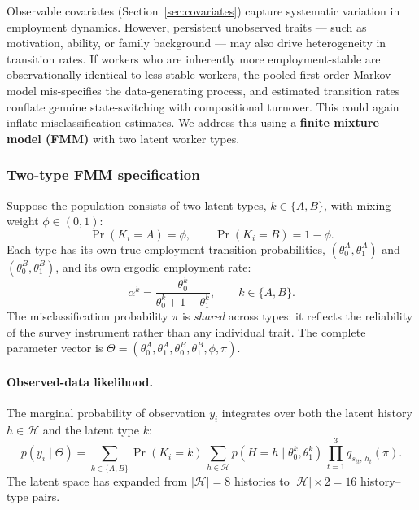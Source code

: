 Observable covariates (Section~\ref{sec:covariates}) capture systematic
variation in employment dynamics. However, persistent unobserved traits
--- such as motivation, ability, or family background --- may also drive
heterogeneity in transition rates. If workers who are inherently more
employment-stable are observationally identical to less-stable workers,
the pooled first-order Markov model mis-specifies the data-generating
process, and estimated transition rates conflate genuine state-switching
with compositional turnover. This could again inflate misclassification
estimates. We address this using a \textbf{finite mixture model (FMM)}
with two latent worker types.

\subsubsection{Two-type FMM specification}

Suppose the population consists of two latent types,
\(k \in \{A, B\}\), with mixing weight \(\phi \in (0, 1)\):
\[
\Pr(K_i = A) = \phi, \qquad \Pr(K_i = B) = 1 - \phi.
\]
Each type has its own true employment transition probabilities,
\((\theta_0^A, \theta_1^A)\) and \((\theta_0^B, \theta_1^B)\), and its
own ergodic employment rate:
\begin{equation}
\alpha^k = \frac{\theta_0^k}{\theta_0^k + 1 - \theta_1^k}, \qquad
k \in \{A, B\}.
\label{eq:alpha_fmm}
\end{equation}
The misclassification probability \(\pi\) is \emph{shared} across types:
it reflects the reliability of the survey instrument rather than any
individual trait. The complete parameter vector is
\(\Theta = (\theta_0^A, \theta_1^A, \theta_0^B, \theta_1^B, \phi, \pi)\).

\paragraph{Observed-data likelihood.}
The marginal probability of observation \(y_i\) integrates over both
the latent history \(h \in \mathcal{H}\) and the latent type \(k\):
\begin{equation}
p(y_i \mid \Theta) = \sum_{k \in \{A,B\}}
  \Pr(K_i = k)\,
  \sum_{h \in \mathcal{H}}
  p(H = h \mid \theta_0^k, \theta_1^k)\,
  \prod_{t=1}^{3} q_{s_{it},\, h_t}(\pi).
\label{eq:marginal_fmm}
\end{equation}
The latent space has expanded from \(|\mathcal{H}| = 8\) histories to
\(|\mathcal{H}| \times 2 = 16\) history--type pairs.

